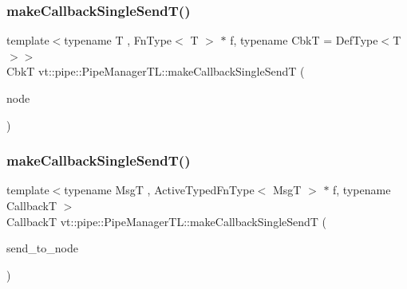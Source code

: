 \subsubsection{\texorpdfstring{make\+Callback\+Single\+Send\+T()}{makeCallbackSingleSendT()}\hspace{0.1cm}{\footnotesize\ttfamily [1/2]}}
{\footnotesize\ttfamily template$<$typename T , Fn\+Type$<$ T $>$ $\ast$ f, typename CbkT  = Def\+Type$<$\+T$>$$>$ \\
CbkT vt\+::pipe\+::\+Pipe\+Manager\+T\+L\+::make\+Callback\+Single\+SendT (\begin{DoxyParamCaption}\item[{\hyperlink{namespacevt_a866da9d0efc19c0a1ce79e9e492f47e2}{Node\+Type} const \&}]{node }\end{DoxyParamCaption})}

\mbox{\label{structvt_1_1pipe_1_1_pipe_manager_t_l_ac4d276c82d9f04628263ffd07841fdcf}} 
\subsubsection{\texorpdfstring{make\+Callback\+Single\+Send\+T()}{makeCallbackSingleSendT()}\hspace{0.1cm}{\footnotesize\ttfamily [2/2]}}
{\footnotesize\ttfamily template$<$typename MsgT , Active\+Typed\+Fn\+Type$<$ Msg\+T $>$ $\ast$ f, typename CallbackT $>$ \\
CallbackT vt\+::pipe\+::\+Pipe\+Manager\+T\+L\+::make\+Callback\+Single\+SendT (\begin{DoxyParamCaption}\item[{\hyperlink{namespacevt_a866da9d0efc19c0a1ce79e9e492f47e2}{Node\+Type} const \&}]{send\+\_\+to\+\_\+node }\end{DoxyParamCaption})}

\mbox{\label{structvt_1_1pipe_1_1_pipe_manager_t_l_a9644742f82b43a851e8a20755302a2e0}} 
